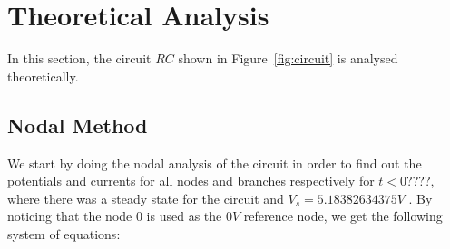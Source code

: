 \section{Theoretical Analysis}
\label{sec:analysis}

In this section, the circuit $RC$ shown in Figure~\ref{fig:circuit} is analysed
theoretically.


\subsection{Nodal Method}

We start by doing the nodal analysis of the circuit in order to find out the potentials and currents for all nodes and branches respectively for $t < 0$????,
where there was a steady state for the circuit and $V_s = 5.18382634375 V$ . By noticing that the node 0 is used as the $0 V$ reference node, we get the following system of equations:




